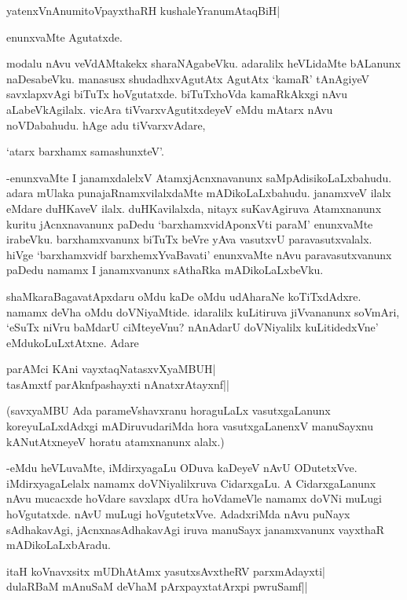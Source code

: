 \begin{shloka}
yatenxVnAnumitoVpayxthaRH kushaleYranumAtaqBiH|
\end{shloka}

enunxvaMte Agutatxde.

modalu nAvu veVdAMtakekx sharaNAgabeVku. adaralilx heVLidaMte bALanunx naDesabeVku. manasusx shudadhxvAgutAtx AgutAtx `kamaR' tAnAgiyeV savxlapxvAgi biTuTx hoVgutatxde. biTuTxhoVda kamaRkAkxgi nAvu aLabeVkAgilalx. vicAra tiVvarxvAgutitxdeyeV eMdu mAtarx nAvu noVDabahudu. hAge adu tiVvarxvAdare,

\begin{shloka}
`atarx barxhamx samashunxteV'.
\end{shloka}

-enunxvaMte I janamxdalelxV AtamxjAcnxnavanunx saMpAdisikoLaLxbahudu. adara mUlaka punajaRnamxvilalxdaMte mADikoLaLxbahudu. janamxveV ilalx eMdare duHKaveV ilalx. duHKavilalxda, nitayx suKavAgiruva Atamxnanunx kuritu jAcnxnavanunx paDedu `barxhamxvidAponxVti paraM' enunxvaMte irabeVku. barxhamxvanunx biTuTx beVre yAva vasutxvU paravasutxvalalx. hiVge `barxhamxvidf barxhemxYvaBavati' enunxvaMte nAvu paravasutxvanunx paDedu namamx I janamxvanunx sAthaRka mADikoLaLxbeVku.

shaMkaraBagavatApxdaru oMdu kaDe oMdu udAharaNe koTiTxdAdxre. namamx deVha oMdu doVNiyaMtide. idaralilx kuLitiruva jiVvananunx soVmAri, `eSuTx niVru baMdarU ciMteyeVnu? nAnAdarU doVNiyalilx kuLitidedxVne' eMdukoLuLxtAtxne. Adare

\begin{shloka}
parAMci KAni vayxtaqNatasxvXyaMBUH|\\
tasAmxtf parAknfpashayxti nAnatxrAtayxnf||
\end{shloka}

(savxyaMBU Ada parameVshavxranu horaguLaLx vasutxgaLanunx koreyuLaLxdAdxgi mADiruvudariMda hora vasutxgaLanenxV manuSayxnu kANutAtxneyeV horatu atamxnanunx alalx.)

-eMdu heVLuvaMte, iMdirxyagaLu ODuva kaDeyeV nAvU ODutetxVve. iMdirxyagaLelalx namamx doVNiyalilxruva CidarxgaLu. A CidarxgaLanunx nAvu mucacxde hoVdare savxlapx dUra hoVdameVle namamx doVNi muLugi hoVgutatxde. nAvU muLugi hoVgutetxVve. AdadxriMda nAvu puNayx sAdhakavAgi, jAcnxnasAdhakavAgi iruva manuSayx janamxvanunx vayxthaR mADikoLaLxbAradu.

\begin{shloka}
itaH koV\s navxsitx mUDhAtAmx yasutxsAvxtheRV parxmAdayxti|\\
dulaRBaM mAnuSaM deVhaM pArxpayxtatArxpi pwruSamf||
\end{shloka}

